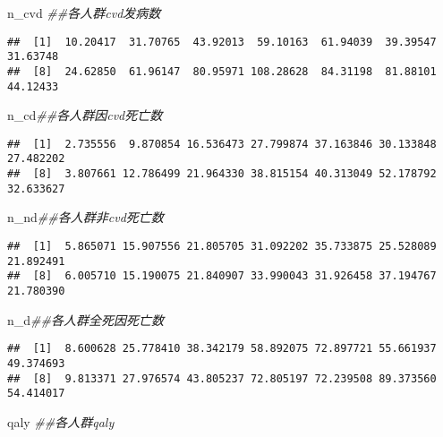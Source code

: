 \documentclass[
]{article}
\newenvironment{Shaded}{\begin{snugshade}}{\end{snugshade}}
\newcommand{\CommentTok}[1]{\textcolor[rgb]{0.56,0.35,0.01}{\textit{#1}}}
\newcommand{\NormalTok}[1]{#1}
\begin{document}
\begin{Shaded}
\begin{Highlighting}[]
\NormalTok{n_cvd }\CommentTok{##各人群cvd发病数}
\end{Highlighting}
\end{Shaded}

\begin{verbatim}
##  [1]  10.20417  31.70765  43.92013  59.10163  61.94039  39.39547  31.63748
##  [8]  24.62850  61.96147  80.95971 108.28628  84.31198  81.88101  44.12433
\end{verbatim}

\begin{Shaded}
\begin{Highlighting}[]
\NormalTok{n_cd}\CommentTok{##各人群因cvd死亡数}
\end{Highlighting}
\end{Shaded}

\begin{verbatim}
##  [1]  2.735556  9.870854 16.536473 27.799874 37.163846 30.133848 27.482202
##  [8]  3.807661 12.786499 21.964330 38.815154 40.313049 52.178792 32.633627
\end{verbatim}

\begin{Shaded}
\begin{Highlighting}[]
\NormalTok{n_nd}\CommentTok{##各人群非cvd死亡数}
\end{Highlighting}
\end{Shaded}

\begin{verbatim}
##  [1]  5.865071 15.907556 21.805705 31.092202 35.733875 25.528089 21.892491
##  [8]  6.005710 15.190075 21.840907 33.990043 31.926458 37.194767 21.780390
\end{verbatim}

\begin{Shaded}
\begin{Highlighting}[]
\NormalTok{n_d}\CommentTok{##各人群全死因死亡数}
\end{Highlighting}
\end{Shaded}

\begin{verbatim}
##  [1]  8.600628 25.778410 38.342179 58.892075 72.897721 55.661937 49.374693
##  [8]  9.813371 27.976574 43.805237 72.805197 72.239508 89.373560 54.414017
\end{verbatim}

\begin{Shaded}
\begin{Highlighting}[]
\NormalTok{qaly }\CommentTok{##各人群qaly}
\end{Highlighting}
\end{Shaded}
\end{document}
